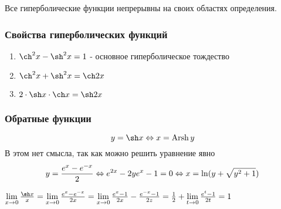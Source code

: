 Все гиперболические функции непрерывны на своих областях определения.

\subsubsection*{Свойства гиперболических функций}

\begin{enumerate}
	\item $\ch^2 x - \sh^2 x = 1$ - основное гиперболическое тождество
	\item $\ch^2 x + \sh^2 x = \ch 2x$
	\item $2 \cdot \sh x \cdot \ch x = \sh 2x$
\end{enumerate}

\subsubsection*{Обратные функции}

$$
	y = \sh x \lra x = \Arsh y
$$
В этом нет смысла, так как можно решить уравнение явно
$$
	y = \frac{e^x - e^{-x}}{2} \Leftrightarrow e^{2x} - 2ye^x - 1 = 0 \Leftrightarrow x = \ln (y + \sqrt{y^2 + 1})
$$

\begin{addition}
	$\liml_{x \to 0} \frac{\sh x}{x} = \liml_{x \to 0} \frac{e^x - e^{-x}}{2x} = \liml_{x \to 0} \frac{e^x - 1}{2x} - \frac{e^{-x} - 1}{2z} = \frac{1}{2} + \liml_{t \to 0} \frac{e^t - 1}{2t} = 1$
\end{addition}